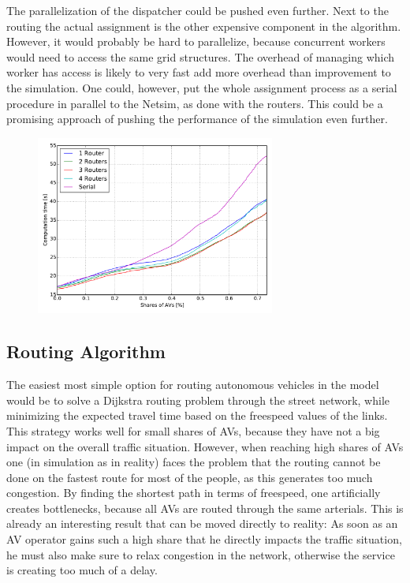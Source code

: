 The parallelization of the dispatcher could be pushed even further. Next to the
routing the actual assignment is the other expensive component in the algorithm.
However, it would probably be hard to parallelize, because concurrent workers
would need to access the same grid structures. The overhead of managing which
worker has access is likely to very fast add more overhead than improvement to
the simulation. One could, however, put the whole assignment process as a serial
procedure in parallel to the Netsim, as done with the routers. This could be a
promising approach of pushing the performance of the simulation even further.

\begin{figure}
    \centering
    \includegraphics[width=0.7\textwidth]{figures/routers.pdf}
    \caption{}
    \label{fig:routers}
\end{figure}

\subsection{Routing Algorithm}

The easiest most simple option for routing autonomous vehicles in the model would
be to solve a Dijkstra routing problem through the street network, while minimizing
the expected travel time based on the freespeed values of the links. This strategy
works well for small shares of AVs, because they have not a big impact on the overall
traffic situation.
However, when reaching high shares of AVs one (in simulation as in reality) faces
the problem that the routing cannot be done on the fastest route for most of the
people, as this generates too much congestion. By finding the shortest path in terms
of freespeed, one artificially creates bottlenecks, because all AVs are routed
through the same arterials. This is already an interesting result that can be moved
directly to reality: As soon as an AV operator gains such a high share that he
directly impacts the traffic situation, he must also make sure to relax congestion
in the network, otherwise the service is creating too much of a delay.

